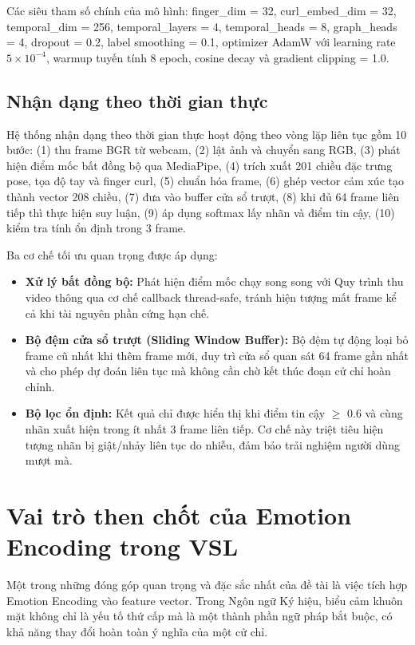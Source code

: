 Các siêu tham số chính của mô hình: finger\_dim = 32, curl\_embed\_dim = 32,
temporal\_dim = 256, temporal\_layers = 4, temporal\_heads = 8, graph\_heads = 4,
dropout = 0.2, label smoothing = 0.1, optimizer AdamW với learning rate
$5 \times 10^{-4}$, warmup tuyến tính 8 epoch, cosine decay và gradient
clipping = 1.0.

\subsection{Nhận dạng theo thời gian thực}

Hệ thống nhận dạng theo thời gian thực hoạt động theo vòng lặp liên tục gồm 10
bước: (1) thu frame BGR từ webcam, (2) lật ảnh và chuyển sang RGB, (3) phát hiện
điểm mốc bất đồng bộ qua MediaPipe, (4) trích xuất 201 chiều đặc trưng
pose, tọa độ tay và finger curl, (5) chuẩn hóa frame, (6) ghép vector cảm xúc
tạo thành vector 208 chiều, (7) đưa vào buffer cửa sổ trượt, (8) khi
đủ 64 frame liên tiếp thì thực hiện suy luận, (9) áp dụng softmax lấy nhãn và
điểm tin cậy, (10) kiểm tra tính ổn định trong 3 frame.

Ba cơ chế tối ưu quan trọng được áp dụng:

\begin{itemize}
    \item \textbf{Xử lý bất đồng bộ:} Phát hiện
    điểm mốc chạy song song với Quy trình thu video thông qua cơ chế callback
    thread-safe, tránh hiện tượng mất frame kể cả khi tài nguyên phần cứng hạn
    chế.

    \item \textbf{Bộ đệm cửa sổ trượt (Sliding Window Buffer):} Bộ đệm tự động
    loại bỏ frame cũ nhất khi thêm frame mới, duy trì cửa sổ quan sát 64 frame
    gần nhất và cho phép dự đoán liên tục mà không cần chờ kết thúc đoạn cử chỉ
    hoàn chỉnh.

    \item \textbf{Bộ lọc ổn định:} Kết quả chỉ được hiển thị
    khi điểm tin cậy $\geq$ 0.6 và cùng nhãn xuất hiện trong ít nhất 3 frame
    liên tiếp. Cơ chế này triệt tiêu hiện tượng nhãn bị giật/nhảy liên tục do
    nhiễu, đảm bảo trải nghiệm người dùng mượt mà.
\end{itemize}

\section{Vai trò then chốt của Emotion Encoding trong VSL}

Một trong những đóng góp quan trọng và đặc sắc nhất của đề tài là việc tích hợp Emotion Encoding vào feature vector. Trong Ngôn ngữ Ký hiệu, biểu cảm khuôn mặt không chỉ là yếu tố thứ cấp mà là một thành phần ngữ pháp bắt buộc, có khả năng thay đổi hoàn toàn ý nghĩa của một cử chỉ.


